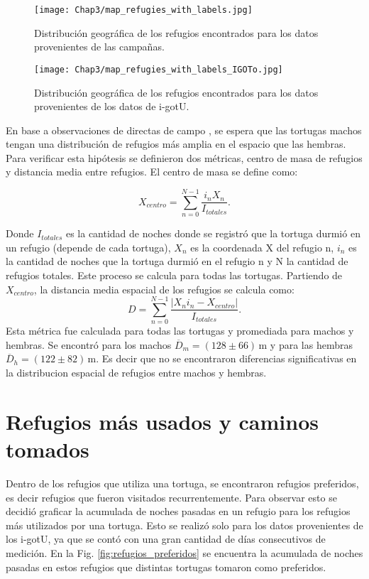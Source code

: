  
\begin{figure}[ht]
    \begin{center}
        \texttt{[image: Chap3/map\_refugies\_with\_labels.jpg]}
        \caption{Distribución geográfica de los refugios encontrados para los datos provenientes de las campañas.}
        \label{fig:refus_campanas_con_labels}
       
        \end{center}
\end{figure}
 
\begin{figure}[ht]
    \begin{center}
        \texttt{[image: Chap3/map\_refugies\_with\_labels\_IGOTo.jpg]}
        \caption{Distribución geográfica de los refugios encontrados para los datos provenientes de los datos de i-gotU.}
        \label{fig:refus_igotu_labels}
       
        \end{center}
\end{figure}
 
En base a observaciones de directas de campo \cite{Erika}, se espera que las tortugas machos tengan una distribución de refugios más amplia en el espacio que las hembras.  Para verificar esta hipótesis se definieron dos métricas, centro de masa de refugios y distancia media entre refugios. El centro de masa se define como:
\begin{center}
   
 
$$X_{centro}= \sum^{N -1}_{n=0} \frac{i_{n} X_n}{I_{totales}}.$$
\end{center}
Donde $I_{totales}$ es la cantidad de noches donde se registró que la tortuga durmió en un refugio (depende de cada tortuga), $X_n$ es la coordenada X del refugio n, $i_{n}$ es la cantidad de noches que la tortuga durmió en el refugio n y N la cantidad de refugios totales.  Este proceso se calcula para todas las tortugas.
Partiendo de $X_{centro}$, la distancia media  espacial de los refugios se calcula como:
$$D = \sum^{N -1}_{n=0} \frac{|X_n i_n - X_{centro}|}{I_{totales}}.$$
\label{eq:distancia_media_refugios}
Esta métrica fue calculada para todas las tortugas y  promediada para  machos y hembras. Se encontró para los machos $\overline{D}_m =  (128\pm66)\,\text{m}$ y para las hembras     $\overline{D}_h = (122\pm82)\,\text{m}$. Es decir que no se encontraron diferencias significativas en la distribucion espacial de refugios  entre machos y hembras.
\section{Refugios más usados y caminos tomados}
Dentro de los refugios que utiliza una tortuga, se encontraron refugios preferidos, es decir refugios que fueron visitados recurrentemente. Para observar esto se decidió graficar la acumulada de noches pasadas en un refugio para los refugios más utilizados por una tortuga. Esto se realizó solo para los datos provenientes de los i-gotU, ya que se contó con una gran cantidad de días consecutivos de medición. En la Fig. \ref{fig:refugios_preferidos} se encuentra la acumulada de noches pasadas en estos refugios que distintas tortugas tomaron como preferidos.
 
